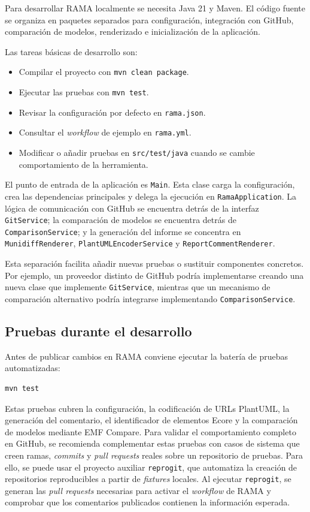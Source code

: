 \documentclass[11pt]{article}
\begin{document}
Para desarrollar RAMA localmente se necesita Java 21 y Maven. El código fuente se organiza en paquetes separados para configuración, integración con GitHub, comparación de modelos, renderizado e inicialización de la aplicación.

Las tareas básicas de desarrollo son:

\begin{itemize}
    \item Compilar el proyecto con \texttt{mvn clean package}.
    \item Ejecutar las pruebas con \texttt{mvn test}.
    \item Revisar la configuración por defecto en \texttt{rama.json}.
    \item Consultar el \textit{workflow} de ejemplo en \texttt{rama.yml}.
    \item Modificar o añadir pruebas en \texttt{src/test/java} cuando se cambie comportamiento de la herramienta.
\end{itemize}

El punto de entrada de la aplicación es \texttt{Main}. Esta clase carga la configuración, crea las dependencias principales y delega la ejecución en \texttt{RamaApplication}. La lógica de comunicación con GitHub se encuentra detrás de la interfaz \texttt{GitService}; la comparación de modelos se encuentra detrás de \texttt{ComparisonService}; y la generación del informe se concentra en \texttt{MunidiffRenderer}, \texttt{PlantUMLEncoderService} y \texttt{ReportCommentRenderer}.

Esta separación facilita añadir nuevas pruebas o sustituir componentes concretos. Por ejemplo, un proveedor distinto de GitHub podría implementarse creando una nueva clase que implemente \texttt{GitService}, mientras que un mecanismo de comparación alternativo podría integrarse implementando \texttt{ComparisonService}.

\subsection{Pruebas durante el desarrollo}

Antes de publicar cambios en RAMA conviene ejecutar la batería de pruebas automatizadas:

\begin{verbatim}
mvn test
\end{verbatim}

Estas pruebas cubren la configuración, la codificación de URLs PlantUML, la generación del comentario, el identificador de elementos Ecore y la comparación de modelos mediante EMF Compare. Para validar el comportamiento completo en GitHub, se recomienda complementar estas pruebas con casos de sistema que creen ramas, \textit{commits} y \textit{pull requests} reales sobre un repositorio de pruebas. Para ello, se puede usar el proyecto auxiliar \texttt{reprogit}, que automatiza la creación de repositorios reproducibles a partir de \textit{fixtures} locales. Al ejecutar \texttt{reprogit}, se generan las \textit{pull requests} necesarias para activar el \textit{workflow} de RAMA y comprobar que los comentarios publicados contienen la información esperada.

\newpage
\end{document}
